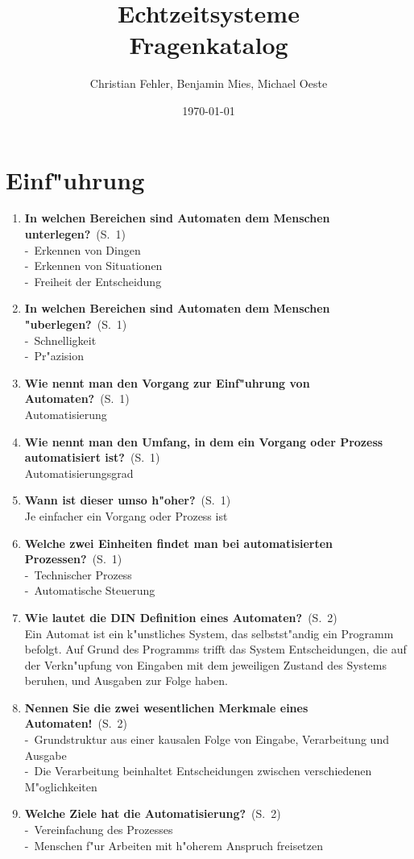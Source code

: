 \documentclass[a4paper,latin1,12pt]{article}
\title{{\Huge Echtzeitsysteme}\\Fragenkatalog}
\author{{\Large Christian Fehler, Benjamin Mies, Michael Oeste}}
\date{\small\today}
\newcommand{\question}[3]{\item {\textbf{#1?}}\ (S.\ #2)\\[2mm]#3}
\newcommand{\statement}[3]{\item {\textbf{#1!}}\ (S.\ #2)\\[2mm]#3}
\newcommand{\catchword}[1]{-\ #1\\}
\newcommand{\normaltext}[1]{#1\\}
\newcommand{\page}[1]{#1}
\begin{document}
\maketitle
\newpage
\tableofcontents

\newpage
\section{Einf"uhrung}

\begin{enumerate}

  \question{In welchen Bereichen sind Automaten dem Menschen unterlegen}{\page{1}}
  {
    \catchword{Erkennen von Dingen}
    \catchword{Erkennen von Situationen}
    \catchword{Freiheit der Entscheidung}
  }

  \question{In welchen Bereichen sind Automaten dem Menschen "uberlegen}{\page{1}}
  {
    \catchword{Schnelligkeit}
    \catchword{Pr"azision}
  }

  \question{Wie nennt man den Vorgang zur Einf"uhrung von Automaten}{\page{1}}
  {
   \normaltext{Automatisierung}
  }

  \question{Wie nennt man den Umfang, in dem ein Vorgang oder Prozess automatisiert ist}{\page{1}}
  {
    \normaltext{Automatisierungsgrad}
  }

  \question{Wann ist dieser umso h"oher}{\page{1}}
  {
    \normaltext{Je einfacher ein Vorgang oder Prozess ist}
  }

  \question{Welche zwei Einheiten findet man bei automatisierten Prozessen}{\page{1}}
  {
    \catchword{Technischer Prozess}
    \catchword{Automatische Steuerung}
  }

  \question{Wie lautet die DIN Definition eines Automaten}{\page{2}}
  {
    \normaltext{Ein Automat ist ein k"unstliches System, das selbstst"andig ein Programm
                befolgt. Auf Grund des Programms trifft das System Entscheidungen, die
                auf der Verkn"upfung von Eingaben mit dem jeweiligen Zustand des Systems
                beruhen, und Ausgaben zur Folge haben.}
  }

  \statement{Nennen Sie die zwei wesentlichen Merkmale eines Automaten}{\page{2}}
  {
    \catchword{Grundstruktur aus einer kausalen Folge von Eingabe, Verarbeitung und Ausgabe}
    \catchword{Die Verarbeitung beinhaltet Entscheidungen zwischen verschiedenen M"oglichkeiten}
  }

  \question{Welche Ziele hat die Automatisierung}{\page{2}}
  {
    \catchword{Vereinfachung des Prozesses}
    \catchword{Menschen f"ur Arbeiten mit h"oherem Anspruch freisetzen}
  }


\end{enumerate}
\end{document}
